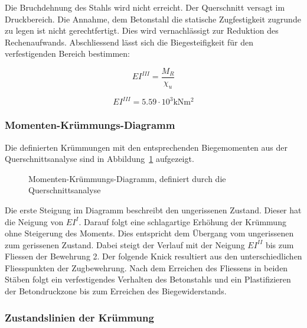 \documentclass[
  12pt,
  letterpaper,
  egregdoesnotlikesansseriftitles]{scrreprt}
\begin{document}
Die Bruchdehnung des Stahls wird nicht erreicht. Der Querschnitt versagt
im Druckbereich. Die Annahme, dem Betonstahl die statische Zugfestigkeit
zugrunde zu legen ist nicht gerechtfertigt. Dies wird vernachlässigt zur
Reduktion des Rechenaufwands. Abschliessend lässt sich die
Biegesteifigkeit für den verfestigenden Bereich bestimmen:

\begin{equation}EI^{III} = \frac{M_{R}}{\chi_{u}}\end{equation}

\begin{equation}EI^{III} = 5.59 \cdot 10^{3} \text{kN} \text{m}^{2}\end{equation}

\subsubsection{Momenten-Krümmungs-Diagramm}\label{momenten-kruxfcmmungs-diagramm-1}

Die definierten Krümmungen mit den entsprechenden Biegemomenten aus der
Querschnittsanalyse sind in Abbildung~\ref{fig-mchi_diagramm_sv14}
aufgezeigt.

\begin{figure}[H]


\caption{\label{fig-mchi_diagramm_sv14}Momenten-Krümmungs-Diagramm,
definiert durch die Querschnittsanalyse}

\end{figure}%

Die erste Steigung im Diagramm beschreibt den ungerissenen Zustand.
Dieser hat die Neigung von \(EI^I\). Darauf folgt eine schlagartige
Erhöhung der Krümmung ohne Steigerung des Moments. Dies entspricht dem
Übergang vom ungerissenen zum gerissenen Zustand. Dabei steigt der
Verlauf mit der Neigung \(EI^{II}\) bis zum Fliessen der Bewehrung 2.
Der folgende Knick resultiert aus den unterschiedlichen Fliesspunkten
der Zugbewehrung. Nach dem Erreichen des Fliessens in beiden Stäben
folgt ein verfestigendes Verhalten des Betonstahls und ein
Plastifizieren der Betondruckzone bis zum Erreichen des
Biegewiderstands.

\subsubsection{Zustandslinien der
Krümmung}\label{zustandslinien-der-kruxfcmmung-1}
\end{document}

